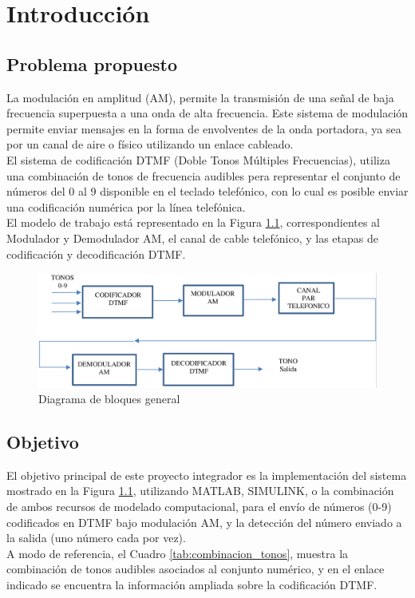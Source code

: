 \chapter{Introducción}
\section{Problema propuesto}
La modulación en amplitud (AM),
permite la transmisión de una señal de
baja frecuencia superpuesta a una onda
de alta frecuencia. Este sistema de
modulación permite enviar mensajes en
la forma de envolventes de la onda
portadora, ya sea por un canal de aire o
físico utilizando un enlace cableado.\\
El sistema de codificación DTMF (Doble
Tonos Múltiples Frecuencias), utiliza una
combinación de tonos de frecuencia
audibles pera representar el conjunto de
números del 0 al 9 disponible en el
teclado telefónico, con lo cual es posible
enviar una codificación numérica por la
línea telefónica.\\
El modelo de trabajo está representado
en la Figura \ref{fig:intro_diagrama_bloques}, correspondientes al
Modulador y Demodulador AM, el canal
de cable telefónico, y las etapas de
codificación y decodificación DTMF.

\begin{figure}[ht]
  \centering
  \includegraphics[width=\linewidth]{images/intro_diagrama_general.png}
  \caption{Diagrama de bloques general}
  \label{fig:intro_diagrama_bloques}
\end{figure}

\section{Objetivo}
El objetivo principal de este proyecto
integrador es la implementación del
sistema mostrado en la Figura \ref{fig:intro_diagrama_bloques},
utilizando MATLAB, SIMULINK, o la
combinación de ambos recursos de
modelado computacional, para el
envío de números (0-9) codificados
en DTMF bajo modulación AM, y la
detección del número enviado a la
salida (uno número cada por vez).\\
A modo de referencia, el Cuadro \ref{tab:combinacion_tonos},
muestra la combinación de tonos
audibles asociados al conjunto
numérico, y en el enlace indicado
se encuentra la información ampliada
sobre la codificación DTMF.

